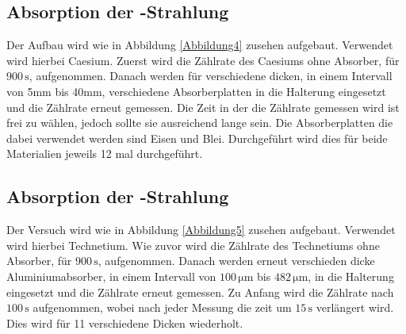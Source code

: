 \subsection{Absorption der \textgamma -Strahlung}

\begin{flushleft}
    Der Aufbau wird wie in Abbildung \ref{Abbildung4} zusehen aufgebaut.
    Verwendet wird hierbei Caesium. 
    Zuerst wird die Zählrate des Caesiums ohne Absorber, für $900\,\unit{\second}$, aufgenommen.
    Danach werden für verschiedene dicken, in einem Intervall von 5mm bis 40mm, verschiedene Absorberplatten in die Halterung eingesetzt und die Zählrate erneut gemessen.
    Die Zeit in der die Zählrate gemessen wird ist frei zu wählen, jedoch sollte sie ausreichend lange sein.
    Die Absorberplatten die dabei verwendet werden sind Eisen und Blei. 
    Durchgeführt wird dies für beide Materialien jeweils 12 mal durchgeführt.
\end{flushleft}

\subsection{Absorption der \textbeta -Strahlung}

\begin{flushleft}
    Der Versuch wird wie in Abbildung \ref{Abbildung5} zusehen aufgebaut.
    Verwendet wird hierbei Technetium.
    Wie zuvor wird die Zählrate des Technetiums ohne Absorber, für $900\,\unit{\second}$, aufgenommen.
    Danach werden erneut verschieden dicke Aluminiumabsorber, in einem Intervall von $100\,\unit{\micro\meter}$ bis $482\,\unit{\micro\meter}$, in die Halterung eingesetzt und die Zählrate erneut gemessen.
    Zu Anfang wird die Zählrate nach $100\,\unit{\second}$ aufgenommen, wobei nach jeder Messung die zeit um $15\,\unit{\second}$ verlängert wird. 
    Dies wird für 11 verschiedene Dicken wiederholt.
\end{flushleft}